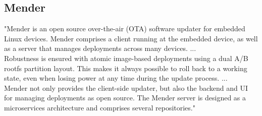 \subsection{Mender}
"Mender is an open source over-the-air (OTA) software updater for embedded Linux devices. Mender comprises a client running at the embedded device, as well as a server that manages deployments across many devices. ...\\
Robustness is ensured with atomic image-based deployments using a dual A/B rootfs partition layout. This makes it always possible to roll back to a working state, even when losing power at any time during the update process. ...\\
Mender not only provides the client-side updater, but also the backend and UI for managing deployments as open source. The Mender server is designed as a microservices architecture and comprises several repositories."\cite{mender-github}

